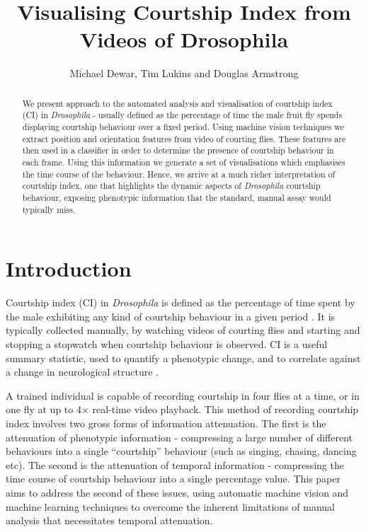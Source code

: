 \documentclass[twocolumn]{article}
\title{Visualising Courtship Index from Videos of Drosophila}
\author{Michael Dewar, Tim Lukins and Douglas Armstrong}
\begin{document}
	
	\maketitle

	\begin{abstract}
	We present approach to the automated analysis and visualisation of courtship index (CI) in \emph{Drosophila} - usually defined as the percentage of time the male fruit fly spends displaying courtship behaviour over a fixed period. Using machine vision techniques we extract position and orientation features from video of courting flies. These features are then used in a classifier in order to determine the presence of courtship behaviour in each frame. Using this information we generate a set of visualisations which emphasises the time course of the behaviour. Hence, we arrive at a much richer interpretation of courtship index, one that highlights the dynamic aspects of \emph{Drosophila} courtship behaviour, exposing phenotypic information that the standard, manual assay would typically miss.
	\end{abstract}

\section{Introduction}

Courtship index (CI) in \emph{Drosophila} is defined as the percentage of time spent by the male exhibiting any kind of courtship behaviour in a given period \cite{}. It is typically collected manually, by watching videos of courting flies and starting and stopping a stopwatch when courtship behaviour is observed. CI is a useful summary statistic, used to quantify a phenotypic change, and to correlate against a change in neurological structure \cite{}.

A trained individual is capable of recording courtship in four flies at a time, or in one fly at up to 4$\times$ real-time video playback. This method of recording courtship index involves two gross forms of information attenuation. The first is the attenuation of phenotypic information - compressing a large number of different behaviours into a single ``courtship'' behaviour (such as singing, chasing, dancing etc). The second is the attenuation of temporal information - compressing the time course of courtship behaviour into a single percentage value. This paper aims to address the second of these issues, using automatic machine vision and machine learning techniques to overcome the inherent limitations of manual analysis that necessitates temporal attenuation.
\end{document}
